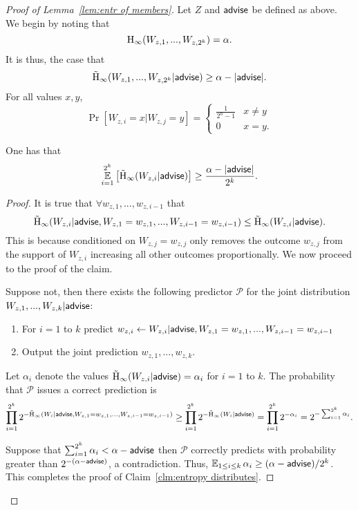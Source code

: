\begin{proof}[Proof of Lemma~\ref{lem:entr of members}]
Let $Z$ and ${\mathsf{advise}}$ be defined as above. We begin by noting that 
\[
\mathrm{H}_\infty(W_{z, 1},..., W_{z, 2^k})=\alpha.
\]
 It is thus, the case that 
\[
\tilde{\mathrm{H}}_\infty(W_{z, 1},..., W_{z, 2^ k} | {\mathsf{advise}}) \ge \alpha - |{\mathsf{advise}}|.
\]
For all values $x, y$, 
\[
\Pr[W_{z, i} =x | W_{z, j} = y] = \begin{cases} \frac{1}{2^n-1} &x\neq y\\0&x=y.\end{cases}
\]
\begin{claim}
One has that 
\begin{align*}
\operatorname*{\mathbb{E}}_{i=1}^{2^k} \left[\tilde{\mathrm{H}}_\infty(W_{z, i} | {\mathsf{advise}})\right] \ge \frac{\alpha - |{\mathsf{advise}}|}{2^k}.
\end{align*}
\label{clm:entropy distributes}
\end{claim}
\begin{proof}
It is true that $\forall w_{z,1},..., w_{z,i-1}$ that 
\[
\tilde{\mathrm{H}}_\infty(W_{z,i} | {\mathsf{advise}}, W_{z, 1}=w_{z,1},..., W_{z,i-1}=w_{z,i-1}) \le \tilde{\mathrm{H}}_\infty(W_{z,i} | {\mathsf{advise}}).
\]
This is because conditioned on $W_{z, j} =w_{z,j}$ only removes the outcome $w_{z,j}$ from the support of $W_{z,i}$ increasing all other outcomes proportionally.  
We now proceed to the proof of the claim. 

Suppose not, then there exists the following predictor $\mathcal{P}$ for the joint distribution $W_{z, 1},..., W_{z, k} | {\mathsf{advise}}$:
\begin{enumerate}
\item For $i=1$ to $k$ predict $w_{z,i}\leftarrow W_{z, i}| {\mathsf{advise}}, W_{z,1}=w_{z,1},..., W_{z,i-1}=w_{z,i-1}$
\item Output the joint prediction $w_{z,1},..., w_{z, k}$.  
\end{enumerate}
Let $\alpha_i$ denote the values $\tilde{\mathrm{H}}_\infty(W_{z,i}| {\mathsf{advise}}) = \alpha_i$ for $i=1$ to $k$. 
The probability that $\mathcal{P}$ issues a correct prediction is
\begin{align*}
\prod_{i=1}^{2^k} 2^{-\tilde{\mathrm{H}}_\infty(W_i | {\mathsf{advise}},  W_{z,1}=w_{z,1},..., W_{z,i-1}=w_{z,i-1})} \ge \prod_{i=1}^{2^k} 2^{-\tilde{\mathrm{H}}_\infty(W_i | {\mathsf{advise}})} = \prod_{i=1}^{2^k} 2^{-\alpha_i}  = 2^{-\sum_{i=1}^{2^k} \alpha_i}.
\end{align*}

\noindent
Suppose that $\sum_{i=1}^{2^k} \alpha_i < \alpha-{\mathsf{advise}}$ then $\mathcal{P}$ correctly predicts with probability greater than $2^{-(\alpha-{\mathsf{advise}})}$, a contradiction.  Thus, $\operatorname*{\mathbb{E}}_{1\le i\le k} \alpha_i \ge (\alpha-{\mathsf{advise}})/2^k$. 
This completes the proof of Claim~\ref{clm:entropy distributes}.
\end{proof}


\end{proof}
